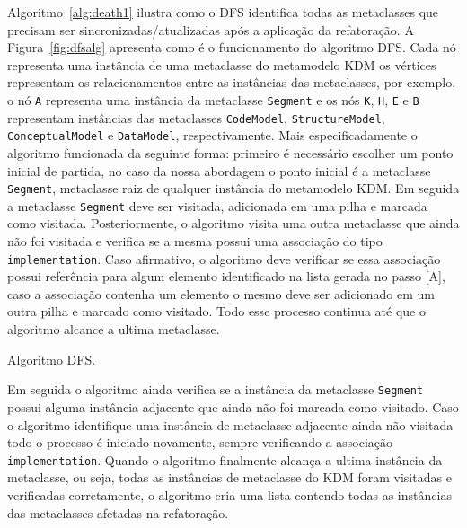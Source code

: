 Algoritmo~\ref{alg:death1} ilustra como o DFS identifica todas as metaclasses que precisam ser sincronizadas/atualizadas após a aplicação da refatoração. A Figura~\ref{fig:dfsalg} apresenta como é o funcionamento do algoritmo DFS. Cada nó representa uma instância de uma metaclasse do metamodelo KDM os vértices representam os relacionamentos entre as instâncias das metaclasses, por exemplo, o nó \texttt{A} representa uma instância da metaclasse \texttt{Segment} e os nós \texttt{K}, \texttt{H}, \texttt{E} e \texttt{B} representam instâncias das metaclasses \texttt{CodeModel}, \texttt{StructureModel}, \texttt{ConceptualModel} e \texttt{DataModel}, respectivamente. Mais especificadamente o algoritmo funcionada da seguinte forma: primeiro é necessário escolher um ponto inicial de partida, no caso da nossa abordagem o ponto inicial é a metaclasse \texttt{Segment}, metaclasse raiz de qualquer instância do metamodelo KDM. Em seguida a metaclasse \texttt{Segment} deve ser visitada, adicionada em uma pilha e marcada como visitada. Posteriormente, o algoritmo visita uma outra metaclasse que ainda não foi visitada e verifica se a mesma possui uma associação do tipo \texttt{implementation}. Caso afirmativo, o algoritmo deve verificar se essa associação possui referência para algum elemento identificado na lista gerada no passo [A], caso a associação contenha um elemento o mesmo deve ser adicionado em um outra pilha e marcado como visitado. Todo esse processo continua até que o algoritmo alcance a ultima metaclasse. 



\begin{algoritmo}[h]
     \SetAlgoLined
     \caption{Algoritmo DFS.}
     \label{alg:death1}
   \end{algoritmo}

Em seguida o algoritmo ainda verifica se a instância da metaclasse \texttt{Segment} possui alguma instância adjacente que ainda não foi marcada como visitado. Caso o algoritmo identifique uma instância de metaclasse adjacente ainda não visitada todo o processo é iniciado novamente, sempre verificando a associação \texttt{implementation}. Quando o algoritmo finalmente alcança a ultima instância da metaclasse, ou seja, todas as instâncias de metaclasse do KDM foram visitadas e verificadas corretamente, o algoritmo cria uma lista contendo todas as instâncias das metaclasses afetadas na refatoração. 
   
